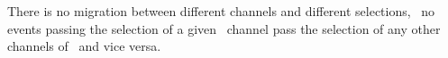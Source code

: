 There is no migration between different channels and different selections, \ie\ no events passing the selection of a given \tHq\ channel pass the selection of any other channels of \ttH\ and vice versa.

\begin{table}[h!]
\centering

\end{table}
